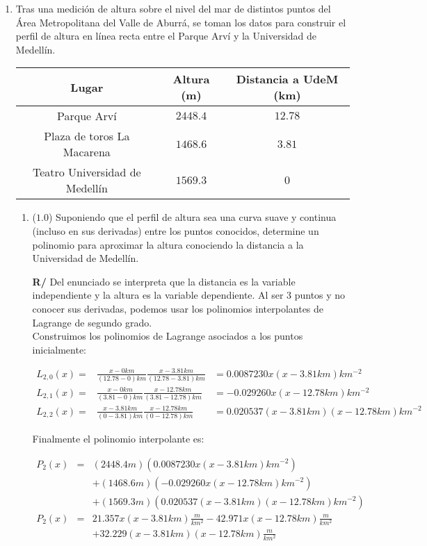 \documentclass[12pt]{article}
\begin{document}
\begin{enumerate}[leftmargin=*,widest=9]
    \item %
    Tras una medición de altura sobre el nivel del mar de distintos puntos del Área Metropolitana del Valle de Aburrá, se toman los datos para construir el perfil de altura en línea recta entre el Parque Arví y la Universidad de Medellín.
    \begin{center}
    \begin{tabular}{|c|c|c|}
    \hline
    Lugar & Altura (m) & Distancia a UdeM (km) \\
    \hline
    Parque Arví & \(2448.4\) & \(12.78\) \\
    Plaza de toros La Macarena & \(1468.6\) & \(3.81\) \\
    Teatro Universidad de Medellín & \(1569.3\) & \(0\) \\
    \hline
    \end{tabular}
    \end{center}

    \begin{enumerate}[label=\alph*]
    \item (\(1.0\)) Suponiendo que el perfil de altura sea una curva suave y continua (incluso en sus derivadas) entre los puntos conocidos, determine un polinomio para aproximar la altura conociendo la distancia a la Universidad de Medellín.

\textbf{R/} Del enunciado se interpreta que la distancia es la variable independiente y la altura es la variable dependiente. Al ser 3 puntos y no conocer sus derivadas, podemos usar los polinomios interpolantes de Lagrange de segundo grado.\\
Construimos los polinomios de Lagrange asociados a los puntos inicialmente:

\begin{eqnarray*}
L_{2,0}(x) = & \frac{x-0km}{(12.78 -0)km}\frac{x-3.81km}{(12.78 - 3.81)km} &= 0.0087230x(x-3.81km)km^{-2}\\
L_{2,1}(x) = & \frac{x-0km}{(3.81 - 0)km}\frac{x-12.78km}{(3.81 - 12.78)km} & = -0.029260x(x-12.78km)km^{-2}\\
L_{2,2}(x) = & \frac{x-3.81 km}{(0-3.81)km} \frac{x-12.78km}{(0-12.78)km} & = 0.020537(x-3.81km)(x-12.78km)km^{-2}
\end{eqnarray*}

Finalmente el polinomio interpolante es:

\begin{eqnarray*}
P_2(x) & = &(2448.4m)(0.0087230x(x-3.81km)km^{-2}) \\
& &+ (1468.6m)(-0.029260x(x-12.78km)km^{-2})\\
& &+ (1569.3m)(0.020537(x-3.81km)(x-12.78km)km^{-2})\\
P_2(x) & =& 21.357x(x-3.81km)\frac{m}{km^2} - 42.971x(x-12.78km)\frac{m}{km^2}\\
&&+32.229(x-3.81km)(x-12.78km)\frac{m}{km^2}
\end{eqnarray*}


\end{enumerate}
\end{enumerate}
\end{document}
